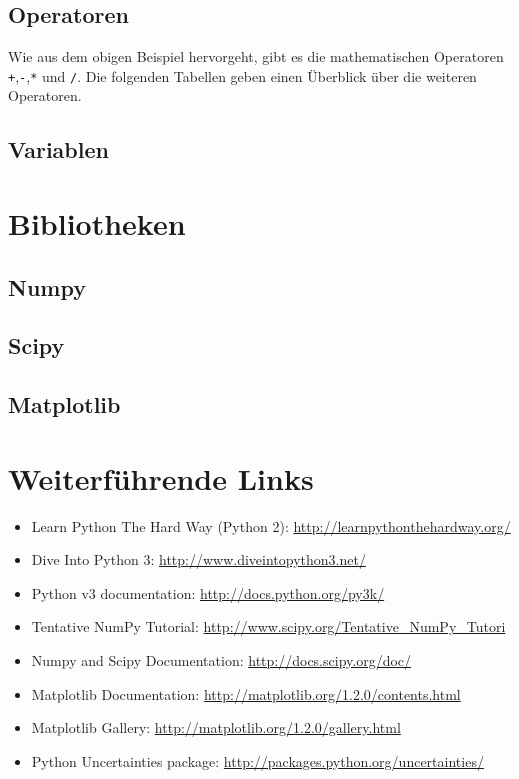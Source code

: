 \subsection{Operatoren}
Wie aus dem obigen Beispiel hervorgeht, gibt es die mathematischen Operatoren \texttt{+},\texttt{-},\texttt{*} und \texttt{/}. Die folgenden Tabellen geben einen Überblick über die weiteren Operatoren.

\subsection{Variablen}

\section{Bibliotheken}
\subsection{Numpy}
\subsection{Scipy}
\subsection{Matplotlib}

\section{Weiterführende Links}
\begin{itemize}
    \item Learn Python The Hard Way (Python 2): \url{http://learnpythonthehardway.org/}
    \item Dive Into Python 3: \url{http://www.diveintopython3.net/}
    \item Python v3 documentation: \url{http://docs.python.org/py3k/}
    \item Tentative NumPy Tutorial: \url{http://www.scipy.org/Tentative\_NumPy\_Tutori  }
    \item Numpy and Scipy Documentation: \url{http://docs.scipy.org/doc/}
    \item Matplotlib Documentation: \url{http://matplotlib.org/1.2.0/contents.html}
    \item Matplotlib Gallery: \url{http://matplotlib.org/1.2.0/gallery.html}
    \item Python Uncertainties package: \url{http://packages.python.org/uncertainties/}
\end{itemize}
